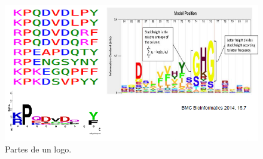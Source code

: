 \begin{figure}[htbp]
\centering
\includegraphics[width = \textwidth]{figs/logo-parts.png}
\caption{Partes de un logo.}
\end{figure}

